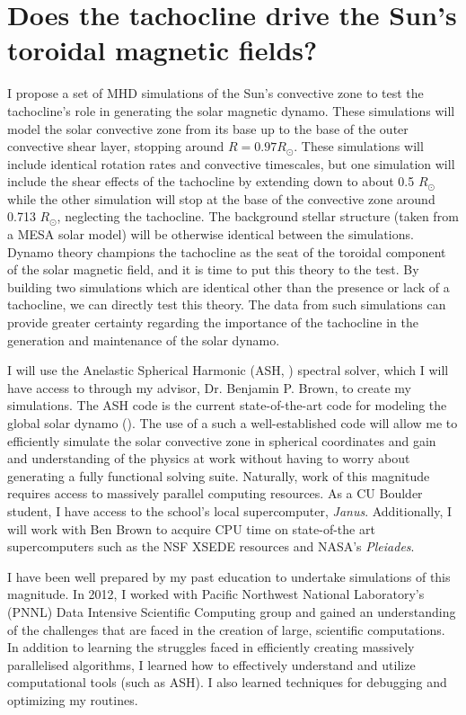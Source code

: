 \documentclass[aasms,12pt]{article}
\begin{document}
\section{Does the tachocline drive the Sun's toroidal magnetic fields?}
I propose a set of MHD simulations of the Sun's convective zone
to test the tachocline's role in generating the solar magnetic 
dynamo.  These simulations will model the solar convective
zone from its base up to the base of the outer convective shear layer, stopping
around $R = 0.97R_{\odot}$.  These simulations will include identical rotation
rates and convective timescales, but one simulation will include the shear
effects of the tachocline by extending down to about 0.5 $R_{\odot}$
while the other simulation will stop at the base of the convective zone
around 0.713 $R_{\odot}$, neglecting the tachocline.  
The background stellar structure (taken from a MESA solar model) will be 
otherwise identical between the simulations.
Dynamo theory champions the tachocline as the seat of the toroidal component
of the solar magnetic field, and it is time to put this theory to the test.
By building two simulations which are identical other than the presence or lack
of a tachocline, we can directly test this theory.  The data from such
simulations can provide greater certainty regarding the importance
of the tachocline in the generation and maintenance of the solar dynamo.

I will use the Anelastic Spherical Harmonic (ASH, 
\citealt{Clune1999}) spectral solver, which I will have access to through my
advisor, Dr. Benjamin P. Brown, to create my simulations.  The ASH code is the
current state-of-the-art code for modeling the global solar dynamo
(\citealt{Toomre2009, Brun2011, Alvan2014}). The use of a such a 
well-established code will allow me to
efficiently simulate the solar convective zone in spherical coordinates and gain
and understanding of the physics at work without having to
worry about generating a fully functional solving suite.  
Naturally, work
of this magnitude requires access to massively parallel computing resources.
As a CU Boulder student, I have access to the school's local supercomputer,
\emph{Janus}.  Additionally, I will work with Ben Brown to acquire CPU time on
state-of-the art supercomputers such as the NSF XSEDE resources and NASA's
\emph{Pleiades}. 

I have been well prepared by my past education to undertake
simulations of this magnitude.  
In 2012, I worked with
Pacific Northwest National Laboratory's (PNNL) Data Intensive Scientific
Computing group and gained an understanding of the challenges that are
faced in the
creation of large, scientific computations.  In addition to learning the
struggles faced in efficiently creating massively parallelised algorithms,
I learned how to effectively understand and utilize computational tools
(such as ASH). I also learned
techniques for debugging and optimizing my routines.
\end{document}
